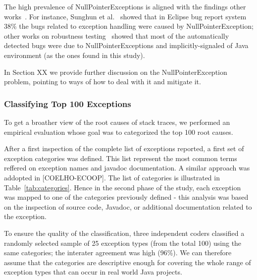\documentclass[conference]{IEEEtran}
\begin{document}
The high prevalence of NullPointerExceptions is aligned with the findings other 
works~\cite{kim2013predicting,fraser20131600,csallner2004jcrasher}. For instance, Sunghun et
al.~\cite{kim2013predicting} showed that in Eclipse bug report system 38\% the bugs 
related to exception handling were caused by NullPointerException; other works on robustness 
testing~\cite{maji2012empirical,csallner2004jcrasher} showed that most of the automatically 
detected bugs were due to NullPointerExceptions and implicitly-signaled of Java
environment (as the ones found in this study).

In Section XX we provide further discussion on the NullPointerException problem, pointing 
to ways of how to deal with it and mitigate it.

\subsubsection{Classifying Top 100 Exceptions}

To get a broather view of the root causes of stack traces, we performed an empirical evaluation
whose goal was to categorized the top 100 root causes.

After a first inspection of the complete list of exceptions reported, a first set of exception 
categories was defined. This list represent the most common terms reffered on exception
names and javadoc documentation. A similar approach was addopted in [COELHO-ECOOP].
The list of categories is illustrated in Table~\ref{tab:categories}. Hence in the second phase
of the study, each exception was mapped to one of the categories previously defined - 
this analysis was based on the inspection of source code, Javadoc, or additional 
documentation related to the exception. 

To ensure the quality of the classification, three independent coders classified a randomly selected
sample of 25 exception types (from the total 100) using the same categories;
the interater agreement was high (96\%). We can therefore assume that the
categories are descriptive enough for covering the whole range of exception
types that can occur in real world Java projects.
\end{document}
